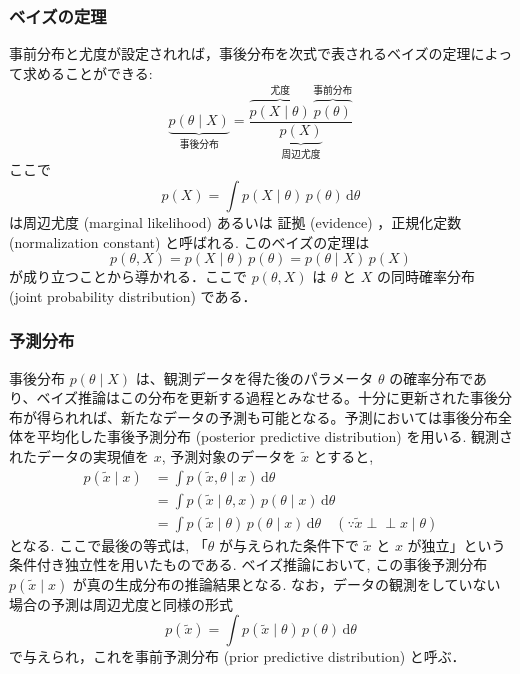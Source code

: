 \documentclass[titlepage]{ltjsbook}
\begin{document}
\subsubsection{ベイズの定理}
事前分布と尤度が設定されれば，事後分布を次式で表されるベイズの定理によって求めることができる: 
\begin{equation}
\underbrace{p(\theta \mid X)}_{\text{事後分布}} = \frac{\overbrace{p(X \mid \theta)}^{\text{尤度}}\, \overbrace{p(\theta)}^{\text{事前分布}}}{\underbrace{p(X)}_{\text{周辺尤度}}}
\end{equation}
ここで
\begin{equation}
p(X) = \int p(X \mid \theta)\, p(\theta)\, \mathrm{d}\theta
\end{equation}
は周辺尤度 (marginal likelihood) あるいは 証拠 (evidence) ，正規化定数 (normalization constant) と呼ばれる. このベイズの定理は
\begin{equation}
p(\theta, X) = p(X \mid \theta)\, p(\theta) = p(\theta \mid X)\, p(X)
\end{equation}
が成り立つことから導かれる．ここで $p(\theta, X)$ は $\theta$ と $X$ の同時確率分布 (joint probability distribution) である．

\subsubsection{予測分布}
事後分布 $p(\theta \mid X)$ は、観測データを得た後のパラメータ $\theta$ の確率分布であり、ベイズ推論はこの分布を更新する過程とみなせる。十分に更新された事後分布が得られれば、新たなデータの予測も可能となる。予測においては事後分布全体を平均化した事後予測分布 (posterior predictive distribution) を用いる. 観測されたデータの実現値を $x$, 予測対象のデータを $\tilde{x}$ とすると, 
\begin{align}
p(\tilde{x} \mid x)
&= \int p(\tilde{x}, \theta \mid x) \, \mathrm{d}\theta\\
&= \int p(\tilde{x} \mid \theta, x) \, p(\theta \mid x) \, \mathrm{d}\theta \\
&= \int p(\tilde{x} \mid \theta) \, p(\theta \mid x) \, \mathrm{d}\theta
\quad (\because \tilde{x} \perp\!\!\!\perp x \mid \theta)
\end{align}
となる. ここで最後の等式は, 「$\theta$ が与えられた条件下で $\tilde{x}$ と $x$ が独立」という条件付き独立性を用いたものである. ベイズ推論において, この事後予測分布 $p(\tilde{x} \mid x)$ が真の生成分布の推論結果となる. なお，データの観測をしていない場合の予測は周辺尤度と同様の形式
\begin{equation}
p(\tilde{x}) = \int p(\tilde{x} \mid \theta)\, p(\theta)\, \mathrm{d}\theta
\end{equation}
で与えられ，これを事前予測分布 (prior predictive distribution) と呼ぶ．
\end{document}

